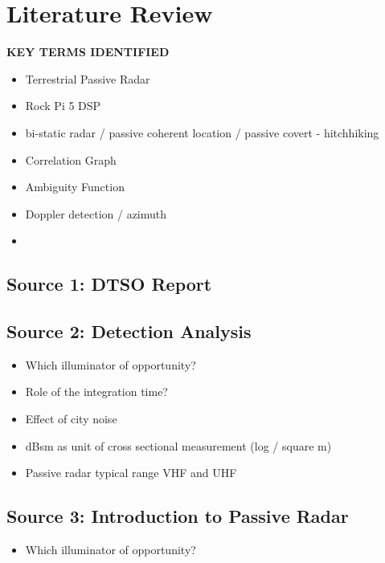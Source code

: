 \documentclass[12pt]{article}
\begin{document}
\section{Literature Review}

\textbf{KEY TERMS IDENTIFIED}
\begin{itemize}
    \item Terrestrial Passive Radar
    \item Rock Pi 5 DSP
    \item bi-static radar / passive coherent location / passive covert - hitchhiking
    \item Correlation Graph
    \item Ambiguity Function
    \item Doppler detection / azimuth
    \item 
\end{itemize}


\subsection{Source 1: DTSO Report}


\subsection{Source 2: Detection Analysis}
\begin{itemize}
    \item Which illuminator of opportunity?
    \item Role of the integration time?
    \item Effect of city noise
    \item dBsm as unit of cross sectional measurement (log / square m)
    \item Passive radar typical range VHF and UHF

\end{itemize}


\subsection{Source 3: Introduction to Passive Radar}
\begin{itemize}
    \item Which illuminator of opportunity?

\end{itemize}
\end{document}
